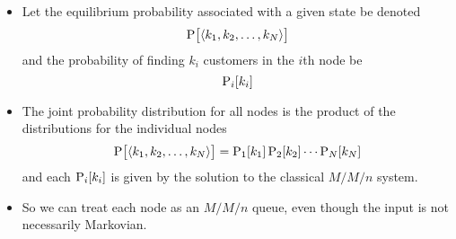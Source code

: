 \begin{itemize}[noitemsep]
\item Let the equilibrium probability associated with a given state be denoted
  \begin{equation}\label{eq:Queuing_Network_Equilibrium_Probability}
    \operatorname{\operatorname{P}} \bigl[ \langle k_{1}, k_{2}, \ldots, k_{N} \rangle \bigr]
  \end{equation}
  and the probability of finding $k_{i}$ customers in the $i$th node be
  \begin{equation*}
    \operatorname{\operatorname{P}}_{i}[k_{i}]
  \end{equation*}

\item The joint probability distribution for all nodes is the product of the distributions for the individual nodes
  \begin{equation*}
    \operatorname{\operatorname{P}} \bigl[ \langle k_{1}, k_{2}, \ldots, k_{N} \rangle \bigr] = \operatorname{\operatorname{P}}_{1}[k_{1}] \operatorname{\operatorname{P}}_{2}[k_{2}] \cdots \operatorname{\operatorname{P}}_{N}[k_{N}]
  \end{equation*}
  and each $\operatorname{\operatorname{P}}_{i}[k_{i}]$ is given by the solution to the classical $M/M/n$ system.
\item So we can treat each node as an $M/M/n$ queue, even though the input is not necessarily Markovian.
\end{itemize}

